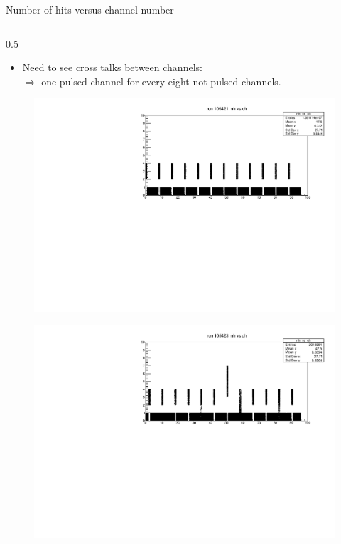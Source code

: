 \documentclass{beamer}[10pt]
\begin{document}
\begin{frame}{Number of hits versus channel number}
\begin{columns}
\begin{column}{0.5\framewidth}
\vspace{-2mm}
\begin{itemize}
\item Need to see cross talks between channels:
\\
$\Rightarrow$ one pulsed channel for every eight not pulsed channels.
\end{itemize}
\vspace{-4mm}
\begin{figure}[H]
   \centering
   \includegraphics[width= 1.0\columnwidth]{figures/pdf/nhitsvsch_105421.pdf}
   \label{fig:wfgkghl}
 \end{figure}
\vspace{-6mm}
\begin{figure}[H]
   \centering
   \includegraphics[width= 1.0\columnwidth]{figures/pdf/nhitsvsch_105423.pdf}

\end{figure}
\end{column}
\end{columns}
\end{frame}
\end{document}
